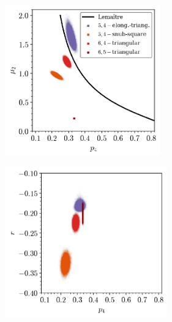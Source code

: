 \begin{figure}[bt]
     \centering
     
     \begin{subfigure}[b]{0.45\textwidth}
         \centering
         \includegraphics[height=6.5cm]{./figures/procrystals/pro45_p4_mu2.pdf}
         \caption{}
         \label{fig:pro45p6mu2}
     \end{subfigure}
     \hfill
     \begin{subfigure}[b]{0.45\textwidth}
         \centering
         \includegraphics[height=6.5cm]{./figures/procrystals/pro45_p4_r.pdf}
         \caption{}
         \label{fig:pro45p6r}
     \end{subfigure}
     

\end{figure}
